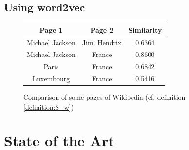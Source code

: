 \documentclass[11pt]{article}
\theoremstyle{plain}
\theoremstyle{definition}
\theoremstyle{remark}
\begin{document}
\subsection{Using word2vec}


\begin{figure}[hb]
    \caption{Comparison of some pages of Wikipedia (cf. definition \ref{definition:S_w})}
    \label{fig:similarity}
	\centering
	\begin{tabular}{c|c|c}
		Page 1			&	Page 2			&	Similarity \\
		\hline\hline
		Michael Jackson	&	Jimi Hendrix	&	0.6364	\\
		Michael Jackson	&	France			&	0.8600	\\
		Paris			&	France			&	0.6842	\\
		Luxembourg		&	France			&	0.5416	\\
  \end{tabular}
\end{figure}


\section{State of the Art}






\end{document}
